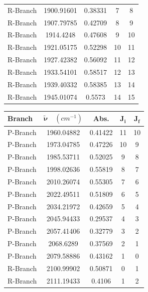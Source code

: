 \documentclass[titlepage]{article}
\begin{document}
\begin{figure}[htbp]
\begin{minipage}[t]{0.48\textwidth}
\begin{tabular}{|l|c|c|c|c|}
        R-Branch & 1900.91601 & 0.38331 & 7 & 8 \\ 
        R-Branch & 1907.79785 & 0.42709 & 8 & 9 \\ 
        R-Branch & 1914.4248 & 0.47608 & 9 & 10 \\ 
        R-Branch & 1921.05175 & 0.52298 & 10 & 11 \\ 
        R-Branch & 1927.42382 & 0.56092 & 11 & 12 \\ 
        R-Branch & 1933.54101 & 0.58517 & 12 & 13 \\ 
        R-Branch & 1939.40332 & 0.58385 & 13 & 14 \\ 
        R-Branch & 1945.01074 & 0.5573 & 14 & 15 \\ \hline
        \end{tabular}
        \label{tab:dbr}
    \end{minipage}
    \vspace{2em}
    \hfill
    \begin{minipage}[t]{0.48\textwidth}
        \centering
        \begin{tabular}{|l|c|c|c|c|}
        \hline
        \textbf{Branch} & \(\mathbf{\tilde{\nu}} \quad \left(cm^{-1}\right)\) 
        & \textbf{Abs.} & \(\mathbf{J_i}\) & \(\mathbf{J_f}\) \\ \hline
        P-Branch & 1960.04882 & 0.41422 & 11 & 10 \\ 
        P-Branch & 1973.04785 & 0.47226 & 10 & 9 \\ 
        P-Branch & 1985.53711 & 0.52025 & 9 & 8 \\ 
        P-Branch & 1998.02636 & 0.55819 & 8 & 7 \\ 
        P-Branch & 2010.26074 & 0.55305 & 7 & 6 \\ 
        P-Branch & 2022.49511 & 0.51809 & 6 & 5 \\ 
        P-Branch & 2034.21972 & 0.42659 & 5 & 4 \\ 
        P-Branch & 2045.94433 & 0.29537 & 4 & 3 \\ 
        P-Branch & 2057.41406 & 0.32779 & 3 & 2 \\ 
        P-Branch & 2068.6289 & 0.37569 & 2 & 1 \\ 
        P-Branch & 2079.58886 & 0.43162 & 1 & 0 \\
        \hhline{|=====|}
        R-Branch & 2100.99902 & 0.50871 & 0 & 1 \\
        R-Branch & 2111.19433 & 0.4106 & 1 & 2 \\ 

\end{tabular}
\end{minipage}
\end{figure}
\end{document}
